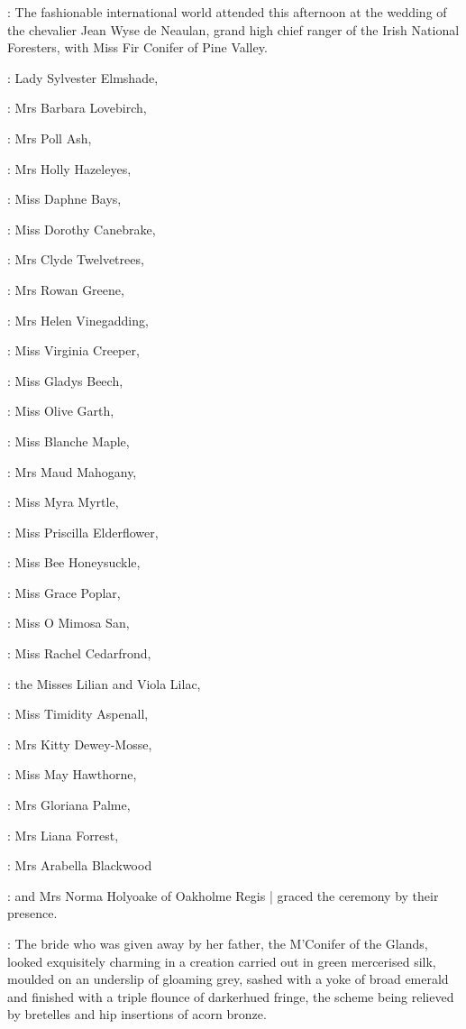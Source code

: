 :
The fashionable international world attended
 this afternoon
at the wedding of the chevalier Jean Wyse de Neaulan,
grand high chief
ranger of the Irish National Foresters,
with Miss Fir Conifer of Pine Valley.

:
Lady Sylvester Elmshade,

:
Mrs Barbara Lovebirch,

:
Mrs Poll Ash,

:
Mrs Holly Hazeleyes,

:
Miss Daphne Bays,

:
Miss Dorothy Canebrake,

:
Mrs Clyde Twelvetrees,

:
Mrs Rowan Greene,

:
Mrs Helen Vinegadding,

:
Miss Virginia Creeper,

:
Miss Gladys Beech,

:
Miss Olive Garth,

:
Miss Blanche Maple,

:
Mrs Maud Mahogany,

:
Miss Myra Myrtle,

:
Miss Priscilla Elderflower,

:
Miss Bee Honeysuckle,

:
Miss Grace Poplar,

:
Miss O Mimosa San,

:
Miss Rachel Cedarfrond,

:
the Misses Lilian and Viola Lilac,

:
Miss Timidity Aspenall,

:
Mrs Kitty Dewey-Mosse,

:
Miss May Hawthorne,

:
Mrs Gloriana Palme,

:
Mrs Liana Forrest,

:
Mrs Arabella Blackwood

:
and Mrs Norma Holyoake of Oakholme Regis |
graced the ceremony by their presence.

:
The bride who was given away by her father,
the M'Conifer of the Glands,
looked exquisitely charming in a creation carried out in green
mercerised silk,
moulded on an underslip of gloaming grey,
sashed with a yoke of broad emerald and finished with a triple flounce of darkerhued fringe,
the scheme being relieved by bretelles and hip insertions of acorn bronze.

